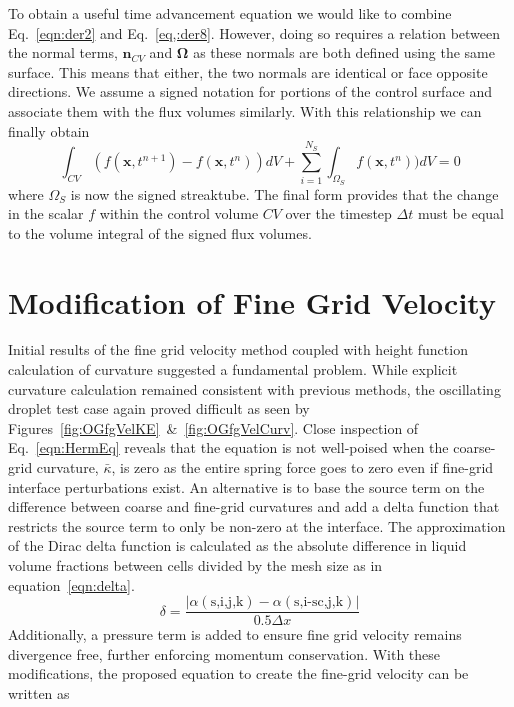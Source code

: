 To obtain a useful time advancement equation we would like to combine Eq.~\ref{eqn:der2} and Eq.~\ref{eq,:der8}. However, doing so requires a relation between the normal terms, $\bm{n}_{CV}$ and $\bm{\Omega}$ as these normals are both defined using the same surface. This means that either, the two normals are identical or face opposite directions. We assume a signed notation for portions of the control surface and associate them with the flux volumes similarly. With this relationship we can finally obtain 
 \begin{equation}
	 \int_{CV} (f (\bm{x} , t^{n+1}) - f (\bm{x} , t^{n}) )dV + \sum_{i=1}^{N_S}\int_{\Omega_S} f (\bm{x} , t^{n}) )dV =0
	 \label{eqn:derFinal}
 \end{equation}
where $\Omega_S$ is now the signed streaktube. The final form provides that the change in the scalar $f$  within the control volume $CV$ over the timestep $\Delta t$ must be equal to the volume integral of the signed flux volumes.

\section{Modification of Fine Grid Velocity}
Initial results of the fine grid velocity method coupled with height function calculation of curvature suggested a fundamental problem. While explicit curvature calculation remained consistent with previous methods, the oscillating droplet test case again proved difficult as seen by Figures~\ref{fig:OGfgVelKE}~\&~\ref{fig:OGfgVelCurv}. Close inspection of Eq.~\ref{eqn:HermEq} reveals that the equation is not well-poised when the coarse-grid curvature, $\bar{\kappa}$, is zero as the entire spring force goes to zero even if fine-grid interface perturbations exist.  An alternative is to base the source term on the difference between coarse and fine-grid curvatures and add a delta function that restricts the source term to only be non-zero at the interface.  The approximation of the Dirac delta function is calculated as the absolute difference in liquid volume fractions between cells divided by the mesh size as in equation~\ref{eqn:delta}.
\begin{equation}
\delta = \frac{|\alpha(\text{s,i,j,k}) - \alpha(\text{s,i-sc,j,k}) | }{0.5 \Delta x}
\label{eqn:delta}
\end{equation}
 Additionally, a pressure term is added to ensure fine grid velocity remains divergence free, further enforcing momentum conservation. With these modifications, the proposed equation to create the fine-grid velocity can be written as


